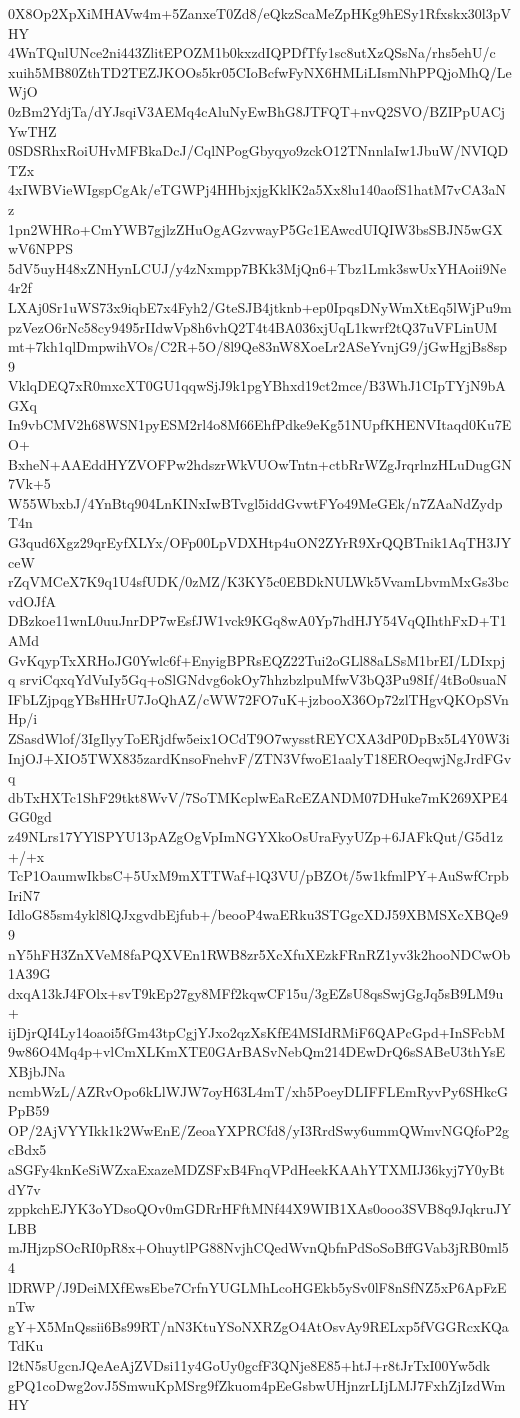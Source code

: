 0X8Op2XpXiMHAVw4m+5ZanxeT0Zd8/eQkzScaMeZpHKg9hESy1Rfxskx30l3pVHY
4WnTQulUNce2ni443ZlitEPOZM1b0kxzdIQPDfTfy1sc8utXzQSsNa/rhs5ehU/c
xuih5MB80ZthTD2TEZJKOOs5kr05CIoBcfwFyNX6HMLiLIsmNhPPQjoMhQ/LeWjO
0zBm2YdjTa/dYJsqiV3AEMq4cAluNyEwBhG8JTFQT+nvQ2SVO/BZIPpUACjYwTHZ
0SDSRhxRoiUHvMFBkaDcJ/CqlNPogGbyqyo9zckO12TNnnlaIw1JbuW/NVIQDTZx
4xIWBVieWIgspCgAk/eTGWPj4HHbjxjgKklK2a5Xx8lu140aofS1hatM7vCA3aNz
1pn2WHRo+CmYWB7gjlzZHuOgAGzvwayP5Gc1EAwcdUIQIW3bsSBJN5wGXwV6NPPS
5dV5uyH48xZNHynLCUJ/y4zNxmpp7BKk3MjQn6+Tbz1Lmk3swUxYHAoii9Ne4r2f
LXAj0Sr1uWS73x9iqbE7x4Fyh2/GteSJB4jtknb+ep0IpqsDNyWmXtEq5lWjPu9m
pzVezO6rNc58cy9495rIIdwVp8h6vhQ2T4t4BA036xjUqL1kwrf2tQ37uVFLinUM
mt+7kh1qlDmpwihVOs/C2R+5O/8l9Qe83nW8XoeLr2ASeYvnjG9/jGwHgjBs8sp9
VklqDEQ7xR0mxcXT0GU1qqwSjJ9k1pgYBhxd19ct2mce/B3WhJ1CIpTYjN9bAGXq
In9vbCMV2h68WSN1pyESM2rl4o8M66EhfPdke9eKg51NUpfKHENVItaqd0Ku7EO+
BxheN+AAEddHYZVOFPw2hdszrWkVUOwTntn+ctbRrWZgJrqrlnzHLuDugGN7Vk+5
W55WbxbJ/4YnBtq904LnKINxIwBTvgl5iddGvwtFYo49MeGEk/n7ZAaNdZydpT4n
G3qud6Xgz29qrEyfXLYx/OFp00LpVDXHtp4uON2ZYrR9XrQQBTnik1AqTH3JYceW
rZqVMCeX7K9q1U4sfUDK/0zMZ/K3KY5c0EBDkNULWk5VvamLbvmMxGs3bcvdOJfA
DBzkoe11wnL0uuJnrDP7wEsfJW1vck9KGq8wA0Yp7hdHJY54VqQIhthFxD+T1AMd
GvKqypTxXRHoJG0Ywlc6f+EnyigBPRsEQZ22Tui2oGLl88aLSsM1brEI/LDIxpjq
srviCqxqYdVuIy5Gq+oSlGNdvg6okOy7hhzbzlpuMfwV3bQ3Pu98If/4tBo0suaN
IFbLZjpqgYBsHHrU7JoQhAZ/cWW72FO7uK+jzbooX36Op72zlTHgvQKOpSVnHp/i
ZSasdWlof/3IgIlyyToERjdfw5eix1OCdT9O7wysstREYCXA3dP0DpBx5L4Y0W3i
InjOJ+XIO5TWX835zardKnsoFnehvF/ZTN3VfwoE1aalyT18EROeqwjNgJrdFGvq
dbTxHXTc1ShF29tkt8WvV/7SoTMKcplwEaRcEZANDM07DHuke7mK269XPE4GG0gd
z49NLrs17YYlSPYU13pAZgOgVpImNGYXkoOsUraFyyUZp+6JAFkQut/G5d1z+/+x
TcP1OaumwIkbsC+5UxM9mXTTWaf+lQ3VU/pBZOt/5w1kfmlPY+AuSwfCrpbIriN7
IdloG85sm4ykl8lQJxgvdbEjfub+/beooP4waERku3STGgcXDJ59XBMSXcXBQe99
nY5hFH3ZnXVeM8faPQXVEn1RWB8zr5XcXfuXEzkFRnRZ1yv3k2hooNDCwOb1A39G
dxqA13kJ4FOlx+svT9kEp27gy8MFf2kqwCF15u/3gEZsU8qsSwjGgJq5sB9LM9u+
ijDjrQI4Ly14oaoi5fGm43tpCgjYJxo2qzXsKfE4MSIdRMiF6QAPcGpd+InSFcbM
9w86O4Mq4p+vlCmXLKmXTE0GArBASvNebQm214DEwDrQ6sSABeU3thYsEXBjbJNa
ncmbWzL/AZRvOpo6kLlWJW7oyH63L4mT/xh5PoeyDLIFFLEmRyvPy6SHkcGPpB59
OP/2AjVYYIkk1k2WwEnE/ZeoaYXPRCfd8/yI3RrdSwy6ummQWmvNGQfoP2gcBdx5
aSGFy4knKeSiWZxaExazeMDZSFxB4FnqVPdHeekKAAhYTXMIJ36kyj7Y0yBtdY7v
zppkchEJYK3oYDsoQOv0mGDRrHFftMNf44X9WIB1XAs0ooo3SVB8q9JqkruJYLBB
mJHjzpSOcRI0pR8x+OhuytlPG88NvjhCQedWvnQbfnPdSoSoBffGVab3jRB0ml54
lDRWP/J9DeiMXfEwsEbe7CrfnYUGLMhLcoHGEkb5ySv0lF8nSfNZ5xP6ApFzEnTw
gY+X5MnQssii6Bs99RT/nN3KtuYSoNXRZgO4AtOsvAy9RELxp5fVGGRcxKQaTdKu
l2tN5sUgcnJQeAeAjZVDsi11y4GoUy0gcfF3QNje8E85+htJ+r8tJrTxI00Yw5dk
gPQ1coDwg2ovJ5SmwuKpMSrg9fZkuom4pEeGsbwUHjnzrLIjLMJ7FxhZjIzdWmHY
